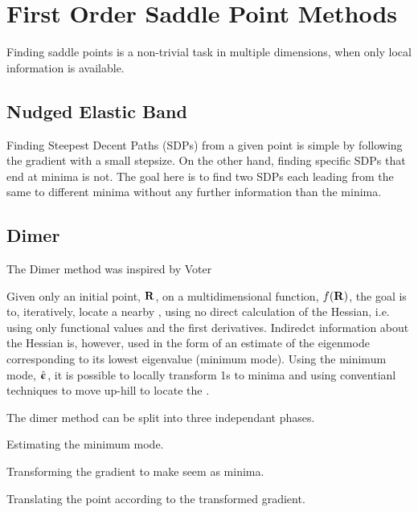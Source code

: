 \section{First Order Saddle Point Methods}
\label{sec:sps}

Finding saddle points is a non-trivial task in multiple dimensions, when only local information is available.

\incomplete

\subsection{Nudged Elastic Band}
\label{sec:neb}

Finding Steepest Decent Paths (SDPs) from a given point is simple by following the gradient with a small stepsize.
On the other hand, finding specific SDPs that end at minima is not.
The goal here is to find two SDPs each leading from the same  to different minima without any further information than the minima.


\incomplete

\subsection{Dimer}
\label{sec:dimer}

The Dimer method was inspired by Voter\cite{voter-hyperdynamics-1997}

Given only an initial point, ${\mathrm{\mathbf{\bm{R}}}}$, on a multidimensional function, $f({\mathrm{\mathbf{\bm{R}}}})$, the goal is to, iteratively, locate a nearby , using no direct calculation of the Hessian, i.e. using only functional values and the first derivatives.
Indiredct information about the Hessian is, however, used in the form of an estimate of the eigenmode corresponding to its lowest eigenvalue (minimum mode).
Using the minimum mode, $\hat{{\mathrm{\mathbf{\bm{\upepsilon}}}}}$, it is possible to locally transform \sap1s to minima and using conventianl techniques to move up-hill to locate the .

The dimer method can be split into three independant phases.
\item Estimating the minimum mode.
\item Transforming the gradient to make  seem as minima.
\item Translating the point according to the transformed gradient.
\een

